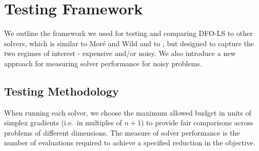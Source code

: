 \section{Testing Framework} \label{sec_testing_framework}


We outline the framework we used for testing and comparing DFO-LS to other solvers, which is similar to  Mor\'e and Wild \cite{More2009} and to \cite{Cartis2017a}, but designed to capture the two regimes of interest - expensive and/or noisy. We also introduce a new approach for measuring solver performance for noisy problems.



\subsection{Testing Methodology} \label{sec_testing_methodology}
When running each solver, we choose the maximum allowed budget in units of simplex gradients (i.e.~in multiples of $n+1$) to provide fair comparisons across problems of different dimensions.
The measure of solver performance  is the number of evaluations required to achieve a specified reduction in the objective. 


